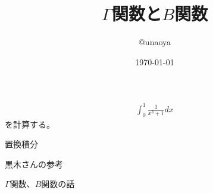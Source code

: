 \documentclass{jsarticle}
\title{$\Gamma$関数と$B$関数}
\author{@unaoya}
\date{\today}
\begin{document}
\maketitle
\begin{align*}
\int_0^1\frac{1}{x^3+1}dx
\end{align*}
を計算する。

置換積分

黒木さんの参考

$\Gamma$関数、$B$関数の話
\end{document}
